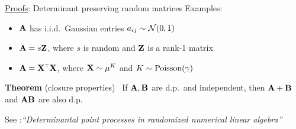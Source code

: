 \documentclass{beamer}
\begin{document}
\begin{frame}
\begin{columns}
\begin{column}{0.32\textwidth}
\begin{block}{\underline{Proofs}: Determinant preserving random
      matrices}
Examples:
  \begin{itemize}
  \item $\mathbf A$ has i.i.d.~Gaussian entries  $a_{ij}\sim\mathcal{N}(0,1)$
  \item $\mathbf A = s\mathbf Z$, where $s$ is random and $\mathbf Z$ is a 
    rank-1 matrix
    \item $\A=\X^\top\X$, where $\mathbf X\sim\mu^K$ and $K\sim{\operatorname{Poisson}}(\gamma)$
    \end{itemize}
\vspace{1cm}
    
\textbf{Theorem} (closure properties) \
    If $\mathbf A,\mathbf B$ are d.p.~and independent, then $\mathbf A+\mathbf B$ and $\mathbf A\mathbf B$ are
    also d.p.
    \vspace{6mm}
    
{\footnotesize See \cite{dpps-in-randnla}:\textit{``Determinantal
    point processes in randomized numerical 
        linear algebra''}}

\end{block}

\end{column}
\end{columns}
\vspace{3cm}


  
\end{frame}
\end{document}
